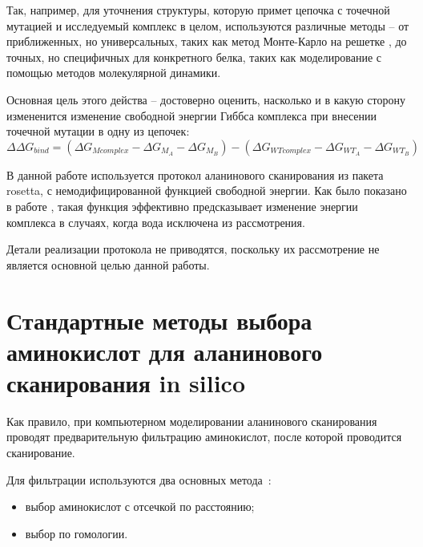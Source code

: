 Так, например, для уточнения структуры, которую примет цепочка с точечной мутацией и исследуемый комплекс в целом, используются различные методы -- от приближенных, но универсальных, таких как метод Монте-Карло на решетке \cite{monte_carlo}, до точных, но специфичных для конкретного белка, таких как моделирование с помощью методов молекулярной динамики.

Основная цель этого действа -- достоверно оценить, насколько и в какую сторону измененится изменение свободной энергии Гиббса \ddG комплекса при внесении точечной мутации в одну из цепочек:
$$
\Delta\Delta G_{bind} = (\Delta G_{M complex} - \Delta G_{M_A} - \Delta G_{M_B}) - (\Delta G_{WT complex} - \Delta G_{WT_A} - \Delta G_{WT_B})
$$

В данной работе используется протокол аланинового сканирования из пакета rosetta, с немодифицированной функцией свободной энергии. Как было показано в работе \cite{kortemme2002}, такая функция  эффективно предсказывает изменение энергии комплекса в случаях, когда вода исключена из рассмотрения.

Детали реализации протокола не приводятся, поскольку их рассмотрение не является основной целью данной работы.





\newpage
\section{Стандартные методы выбора аминокислот для аланинового сканирования in silico}

Как правило, при компьютерном моделировании аланинового сканирования проводят предварительную фильтрацию аминокислот, после которой проводится сканирование. 

Для фильтрации используются два основных метода~\cite{hotspots2012rev}:
\begin{itemize}
\item выбор аминокислот с отсечкой по расстоянию;

\item выбор по гомологии.
\end{itemize}

